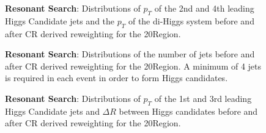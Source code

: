 {\begin{figure}[ht]
	    \caption{\textbf{Resonant Search}: Distributions of $p_{T}$ of the 2nd and 4th leading Higgs Candidate jets and the $p_{T}$ of the di-Higgs system before and after CR derived reweighting for the 20\yr\space \region\space Region.
	    \label{fig:res-\region\yr-2}}
	\end{figure}

	\begin{figure}[ht]
	    \centering
	    \caption{\textbf{Resonant Search}: Distributions of the number of jets before and after CR derived reweighting for the 20\yr\space \region\space Region. A minimum of 4 jets is required in each event in order to form Higgs candidates.
	    \label{fig:res-\region\yr-njet}}
	\end{figure}

	\begin{figure}[ht]
	    \centering


	    \caption{\textbf{Resonant Search}: Distributions of $p_{T}$ of the 1st and 3rd leading Higgs Candidate jets and $\Delta R$ between Higgs candidates before and after CR derived reweighting for the 20\yr\space \region\space Region.
	    \label{fig:res-\region\yr-3}}
	\end{figure}

}
